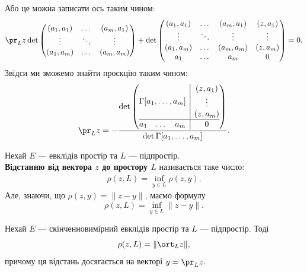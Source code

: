 \documentclass{math_library}
\begin{document}
Або це можна записати ось таким чином:
\[
\pr_L z \det \begin{pmatrix}
(a_1,a_1) & \dots & (a_m,a_1) \\
\vdots & \ddots & \vdots \\
(a_1,a_m) & \dots & (a_m,a_m)
\end{pmatrix} + \det \begin{pmatrix}
(a_1,a_1) & \dots & (a_m,a_1) & (z,a_1) \\
\vdots & \ddots & \vdots & \vdots \\
(a_1,a_m) & \dots & (a_m,a_m) & (z,a_m) \\
a_1 & \dots & a_m & 0
\end{pmatrix} = 0.
\]
Звідси ми зможемо знайти проєкцію таким чином:
\begin{align*}
\pr_L z = -\dfrac{\det \left(\begin{array}{@{}c|c@{}}
\Gamma[a_1,\dots,a_m] & \begin{matrix} (z,a_1) \\ \vdots \\ (z,a_m) \end{matrix} \\
\hline
\begin{matrix} a_1 & \dots & a_m \end{matrix} & 0
\end{array}\right)}{\det\Gamma[a_1,\dots,a_m]}.
\end{align*}

\begin{definition}
Нехай $E$ --- евклідів простір та $L$ --- підпростір.\\
\textbf{Відстанню від вектора $z$ до простору $L$} називається таке число:
\begin{align*}
\rho (z,L) = \inf_{y \in L} \rho(z,y).
\end{align*}
Але, знаючи, що $\rho(z,y) = \| z-y \|$, маємо формулу 
\[
\rho(z,L) =\displaystyle \inf_{y \in L} \| z-y\|.
\]
\end{definition}

\begin{theorem}
Нехай $E$ --- скінченновимірний евклідів простір та $L$ --- підпростір. Тоді 
\[
\rho(z,L) = \| \ort_L z \|,
\]
причому ця відстань досягається на векторі $y = \pr_L z$.
\end{theorem}
\end{document}
